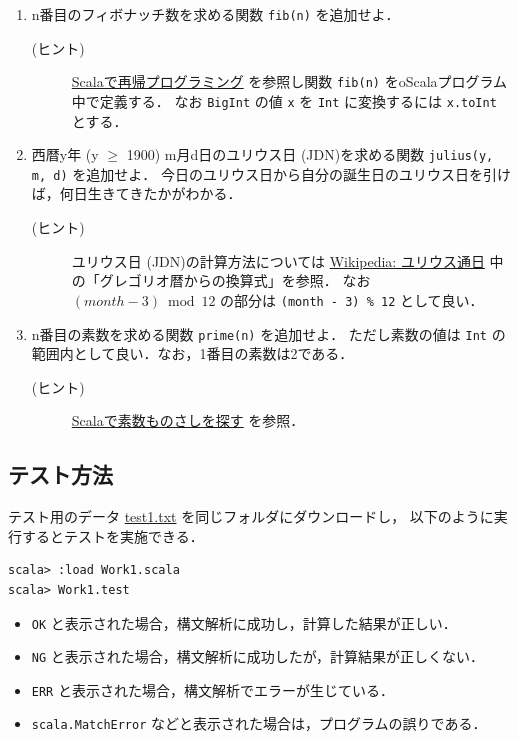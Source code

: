 \documentclass[a4j]{jsarticle}
\begin{document}
\begin{enumerate}
\item n番目のフィボナッチ数を求める関数 \texttt{fib(n)} を追加せよ．
\begin{description}
\item[(ヒント)] \href{file:///home/tamura/lect2/ProLang/2018/org/scala-recursive.org}{Scalaで再帰プログラミング} を参照し関数 \texttt{fib(n)} をoScalaプログラム中で定義する．
     なお \texttt{BigInt} の値 \texttt{x} を \texttt{Int} に変換するには \texttt{x.toInt} とする．
\end{description}
\item 西暦y年 (y $\ge$ 1900) m月d日のユリウス日 (JDN)を求める関数 \texttt{julius(y, m, d)} を追加せよ．
   今日のユリウス日から自分の誕生日のユリウス日を引けば，何日生きてきたかがわかる．
\begin{description}
\item[(ヒント)] ユリウス日 (JDN)の計算方法については \href{https://ja.wikipedia.org/wiki/ユリウス通日}{Wikipedia: ユリウス通日} 中の「グレゴリオ暦からの換算式」を参照．
     なお $(month - 3) \bmod 12$ の部分は \texttt{(month - 3) \% 12} として良い．
\end{description}
\item n番目の素数を求める関数 \texttt{prime(n)} を追加せよ．
   ただし素数の値は \texttt{Int} の範囲内として良い．なお，1番目の素数は2である．
\begin{description}
\item[(ヒント)] \href{file:///home/tamura/lect2/ProLang/2018/org/scala-primeruler.org}{Scalaで素数ものさしを探す} を参照．
\end{description}
\end{enumerate}
\subsection{テスト方法}
\label{sec-5-1}

テスト用のデータ \href{file:///home/tamura/lect2/ProLang/2018/org/prog/parser/test1.txt}{test1.txt} を同じフォルダにダウンロードし，
以下のように実行するとテストを実施できる．


\begin{verbatim}
scala> :load Work1.scala
scala> Work1.test
\end{verbatim}

\begin{itemize}
\item \texttt{OK} と表示された場合，構文解析に成功し，計算した結果が正しい．
\item \texttt{NG} と表示された場合，構文解析に成功したが，計算結果が正しくない．
\item \texttt{ERR} と表示された場合，構文解析でエラーが生じている．
\item \texttt{scala.MatchError} などと表示された場合は，プログラムの誤りである．
\end{itemize}
\end{document}

